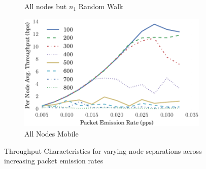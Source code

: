 \documentclass[runningheads,a4paper]{llncs}
\begin{document}
\begin{figure}
\begin{subfigure}{.5\textwidth}
  \caption{All nodes but $n_1$ Random Walk}
  \label{fig:throughput_allbut1}
\end{subfigure}
\begin{subfigure}{.5\textwidth}
\centering
  \includegraphics[width=.9\linewidth]{img/throughput_sep_lines_all_mobile.pdf}
  \caption{All Nodes Mobile}
  \label{fig:throughput_all_mobile}
\end{subfigure}
\caption{Throughput Characteristics for varying node separations across increasing packet emission rates}
\label{fig:scenario_throughputs_plain}
\end{figure}
\end{document}
